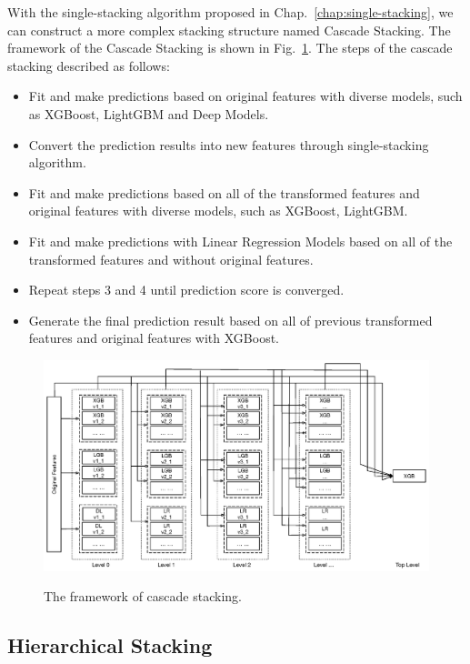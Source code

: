 \documentclass[12pt]{article}
\begin{document}
With the single-stacking algorithm proposed in Chap.~{\ref{chap:single-stacking}}, we can construct a more complex stacking structure named Cascade Stacking. The framework of the Cascade Stacking is shown in Fig.~{\ref{fig:cascade-stacking}}. The steps of the cascade stacking described as follows:

\begin{itemize}
\label{alg:cascade-stacking}
\item[1.] Fit and make predictions based on original features with diverse models, such as XGBoost, LightGBM and Deep Models.
\item[2.] Convert the prediction results into new features through single-stacking algorithm.
\item[3.] Fit and make predictions based on all of the transformed features and original features with diverse models, such as XGBoost, LightGBM.
\item[4.] Fit and make predictions with Linear Regression Models based on all of the transformed features and without original features.
\item[5.] Repeat steps 3 and 4 until prediction score is converged.
\item[6.] Generate the final prediction result based on all of previous transformed features and original features with XGBoost.
\end{itemize}


\begin{figure}[ht]
  \centering
  \includegraphics[width=1.0\textwidth]{../img/cascade-stacking}\\
  \caption{The framework of cascade stacking.}
  \label{fig:cascade-stacking}
\end{figure}

\subsection{Hierarchical Stacking}
\end{document}
